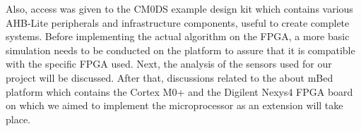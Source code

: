 Also, access was given to the CM0DS example design kit which contains various AHB-Lite peripherals and infrastructure components, useful to create complete systems. Before implementing the actual algorithm on the FPGA, a more basic simulation needs to be conducted on the platform to assure that it is compatible with the specific FPGA used. Next, the analysis of the sensors used for our project will be discussed. After that, discussions related to the about mBed platform which contains the Cortex M0+ and the Digilent Nexys4 FPGA board on which we aimed to implement the microprocessor as an extension will take place.
